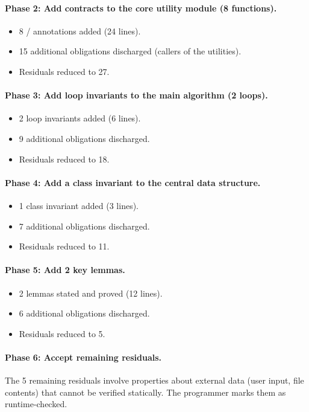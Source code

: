 \documentclass[11pt]{report}
\DeclareRobustCommand{\py}[1]{\texttt{\detokenize{#1}}}
\theoremstyle{definition}
\theoremstyle{plain}
\begin{document}
\paragraph{Phase 2: Add contracts to the core utility module (8 functions).}
\begin{itemize}[nosep]
  \item 8 \py{@requires}/\py{@ensures} annotations added (24 lines).
  \item 15 additional obligations discharged (callers of the utilities).
  \item Residuals reduced to 27.
\end{itemize}

\paragraph{Phase 3: Add loop invariants to the main algorithm (2 loops).}
\begin{itemize}[nosep]
  \item 2 loop invariants added (6 lines).
  \item 9 additional obligations discharged.
  \item Residuals reduced to 18.
\end{itemize}

\paragraph{Phase 4: Add a class invariant to the central data structure.}
\begin{itemize}[nosep]
  \item 1 class invariant added (3 lines).
  \item 7 additional obligations discharged.
  \item Residuals reduced to 11.
\end{itemize}

\paragraph{Phase 5: Add 2 key lemmas.}
\begin{itemize}[nosep]
  \item 2 lemmas stated and proved (12 lines).
  \item 6 additional obligations discharged.
  \item Residuals reduced to 5.
\end{itemize}

\paragraph{Phase 6: Accept remaining residuals.}
The 5 remaining residuals involve properties about external data (user
input, file contents) that cannot be verified statically. The programmer
marks them as runtime-checked.
\end{document}
